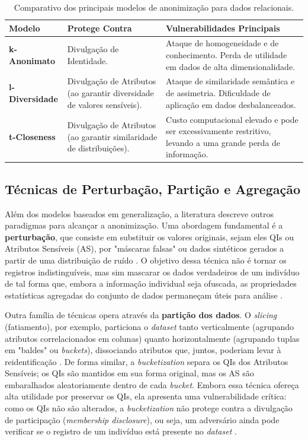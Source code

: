 \begin{table}[h!]
\centering
\caption{Comparativo dos principais modelos de anonimização para dados relacionais.}
\label{tab:modelos-comparativo}
\begin{tabular}{|p{}|p{}|p{}|}
\hline
\textbf{Modelo} & \textbf{Protege Contra} & \textbf{Vulnerabilidades Principais} \\ \hline
\textbf{k-Anonimato} & Divulgação de Identidade. & Ataque de homogeneidade e de conhecimento. Perda de utilidade em dados de alta dimensionalidade. \\ \hline
\textbf{l-Diversidade} & Divulgação de Atributos (ao garantir diversidade de valores sensíveis). & Ataque de similaridade semântica e de assimetria. Dificuldade de aplicação em dados desbalanceados. \\ \hline
\textbf{t-Closeness} & Divulgação de Atributos (ao garantir similaridade de distribuições). & Custo computacional elevado e pode ser excessivamente restritivo, levando a uma grande perda de informação. \\ \hline
\end{tabular}
\end{table}

\subsection{Técnicas de Perturbação, Partição e Agregação}
\label{subsec:fund-outros-paradigmas}

Além dos modelos baseados em generalização, a literatura descreve outros paradigmas para alcançar a anonimização. Uma abordagem fundamental é a \textbf{perturbação}, que consiste em substituir os valores originais, sejam eles QIs ou Atributos Sensíveis (AS), por "máscaras falsas" ou dados sintéticos gerados a partir de uma distribuição de ruído \cite{Olatunji2024}. O objetivo dessa técnica não é tornar os registros indistinguíveis, mas sim mascarar os dados verdadeiros de um indivíduo de tal forma que, embora a informação individual seja ofuscada, as propriedades estatísticas agregadas do conjunto de dados permaneçam úteis para análise \cite{Vovk2023}.

Outra família de técnicas opera através da \textbf{partição dos dados}. O \textit{slicing} (fatiamento), por exemplo, particiona o \textit{dataset} tanto verticalmente (agrupando atributos correlacionados em colunas) quanto horizontalmente (agrupando tuplas em "baldes" ou \textit{buckets}), dissociando atributos que, juntos, poderiam levar à reidentificação \cite{Olatunji2024}. De forma similar, a \textit{bucketization} separa os QIs dos Atributos Sensíveis; os QIs são mantidos em sua forma original, mas os AS são embaralhados aleatoriamente dentro de cada \textit{bucket}. Embora essa técnica ofereça alta utilidade por preservar os QIs, ela apresenta uma vulnerabilidade crítica: como os QIs não são alterados, a \textit{bucketization} não protege contra a divulgação de participação (\textit{membership disclosure}), ou seja, um adversário ainda pode verificar se o registro de um indivíduo está presente no \textit{dataset} \cite{Olatunji2024}.

